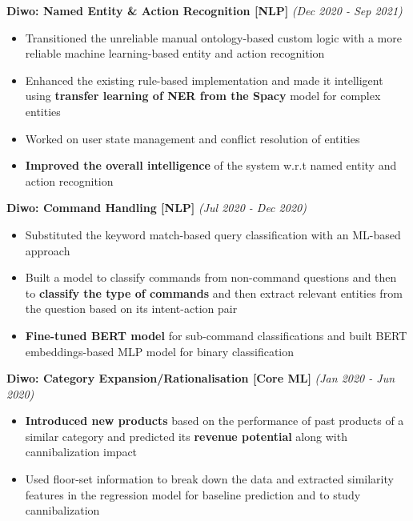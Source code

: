 \documentclass[a4paper,10pt]{article}
\newcommand{\isep}{-2 pt}
\begin{document}
\begin{itemize}
{{\item \textbf{Diwo: Named Entity \& Action Recognition [NLP]}  \hfill {\emph{(Dec 2020 - Sep 2021)}}
    \\[-0.6cm]
    \begin{itemize}\itemsep \isep
        \item Transitioned the unreliable manual ontology-based custom logic with a more reliable machine learning-based entity and action recognition  
        \item Enhanced the existing rule-based implementation and made it intelligent using \textbf{transfer learning of NER from the Spacy} model for complex entities 
        \item Worked on user state management and conflict resolution of entities 
        \item \textbf{Improved the overall intelligence} of the system w.r.t named entity and action recognition 
        \\ [-0.5cm]
    \end{itemize}



\item \textbf{Diwo: Command Handling [NLP]} \hfill {\emph{(Jul 2020 - Dec 2020)}}
    \\[-0.6cm]
    \begin{itemize}\itemsep \isep
    	\item Substituted the keyword match-based query classification with an ML-based approach
            \item Built a model to classify commands from non-command questions and then to \textbf{classify the type of commands} and then extract relevant entities from the question based on its intent-action pair
            \item \textbf{Fine-tuned BERT model} for sub-command classifications and built BERT embeddings-based MLP model for binary classification
        \\ [-0.5cm]
    \end{itemize}


\item \textbf{Diwo: Category Expansion/Rationalisation [Core ML]}  \hfill {\emph{(Jan 2020 - Jun 2020)}}
    \\[-0.6cm]
    \begin{itemize}\itemsep \isep
    	\item \textbf{Introduced new products} based on the performance of past products of a similar category and predicted its \textbf{revenue potential} along with cannibalization impact
            \item Used floor-set information to break down the data and extracted similarity features in the regression model for baseline prediction and to study cannibalization
        \\ [-0.5cm]
    \end{itemize}



}}
\end{itemize}
\end{document}
